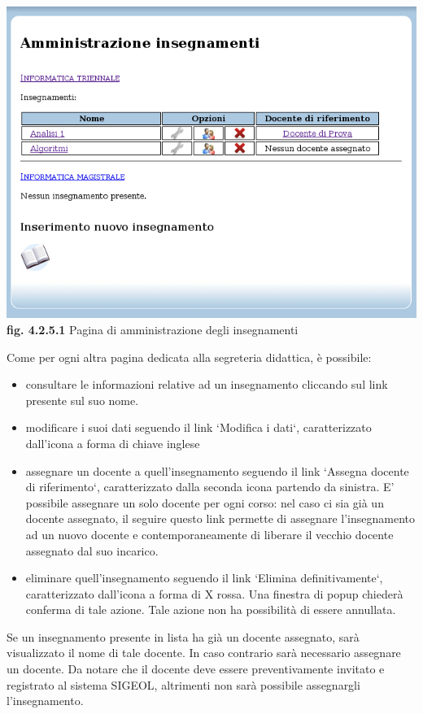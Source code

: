 \documentclass[11pt,a4paper]{article}
\begin{document}
\bigskip
\begin{center}
	\includegraphics[scale=0.5]{images/amministrazione_insegnamenti.jpg}\\
	\textbf{fig. 4.2.5.1} Pagina di amministrazione degli insegnamenti\\
\end{center}
\bigskip

Come per ogni altra pagina dedicata alla segreteria didattica, è possibile:
\begin{itemize}
 \item consultare le informazioni relative ad un insegnamento cliccando sul link presente sul suo nome.
 \item modificare i suoi dati seguendo il link `Modifica i dati`, caratterizzato dall'icona a forma di chiave inglese
 \item assegnare un docente a quell'insegnamento seguendo il link `Assegna docente di riferimento`, caratterizzato dalla seconda icona partendo da sinistra. E' possibile assegnare un solo docente per ogni corso: nel caso ci sia già un docente assegnato, il seguire questo link permette di assegnare l'insegnamento ad un nuovo docente e contemporaneamente di liberare il vecchio docente assegnato dal suo incarico.
 \item eliminare quell'insegnamento seguendo il link `Elimina definitivamente`, caratterizzato dall'icona a forma di X rossa. Una finestra di popup chiederà conferma di tale azione. Tale azione non ha possibilità di essere annullata.
\end{itemize}

Se un insegnamento presente in lista ha già un docente assegnato, sarà visualizzato il nome di tale docente.
In caso contrario sarà necessario assegnare un docente. Da notare che il docente deve essere preventivamente invitato e registrato al sistema SIGEOL, altrimenti non sarà possibile assegnargli l'insegnamento.
\end{document}
